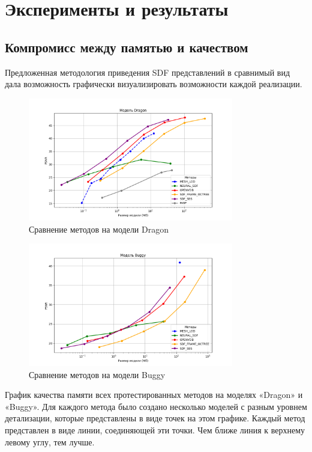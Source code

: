 \documentclass[a4paper,hidelinks,12pt]{article}
\begin{document}
\newpage

\section{Эксперименты и результаты}

\subsection{Компромисс между памятью и качеством}

Предложенная методология приведения SDF представлений в сравнимый вид дала возможность графически визуализировать возможности каждой реализации.

\begin{figure}[ht]
  \centering
  \includegraphics[width=0.8\textwidth]{dragon_psnr.png}
  \caption{Сравнение методов на модели Dragon}
  \label{fig:example}
\end{figure}

\begin{figure}[ht]
  \centering
  \includegraphics[width=0.8\textwidth]{buggy_psnr.png}
  \caption{Сравнение методов на модели Buggy}
  \label{fig:example}
\end{figure}

График качества памяти всех протестированных методов на моделях «Dragon» и «Buggy». Для каждого метода было создано несколько моделей с разным уровнем детализации, которые представлены в виде точек на этом графике. Каждый метод представлен в виде линии, соединяющей эти точки. Чем ближе линия к верхнему левому углу,
тем лучше.
\end{document}
